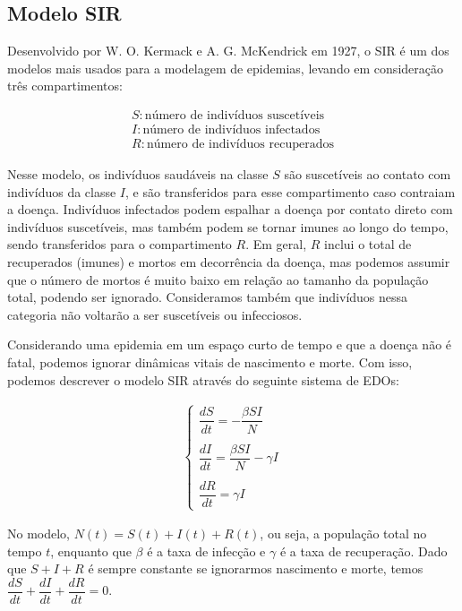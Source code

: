 \documentclass[12pt]{article}
\begin{document}
\subsection{Modelo SIR}

Desenvolvido por W. O. Kermack e A. G. McKendrick em 1927, o SIR é um dos modelos mais usados para a modelagem de epidemias, levando em consideração três compartimentos:

\begin{gather*}
    S: \text{número de indivíduos suscetíveis} \\
    I: \text{número de indivíduos infectados} \\
    R: \text{número de indivíduos recuperados}
\end{gather*}

Nesse modelo, os indivíduos saudáveis na classe $S$ são suscetíveis ao contato com indivíduos da classe $I$, e são transferidos para esse compartimento caso contraiam a doença. Indivíduos infectados podem espalhar a doença por contato direto com indivíduos suscetíveis, mas também podem se tornar imunes ao longo do tempo, sendo transferidos para o compartimento $R$. Em geral, $R$ inclui o total de recuperados (imunes) e mortos em decorrência da doença, mas podemos assumir que o número de mortos é muito baixo em relação ao tamanho da população total, podendo ser ignorado. Consideramos também que indivíduos nessa categoria não voltarão a ser suscetíveis ou infecciosos.   

Considerando uma epidemia em um espaço curto de tempo e que a doença não é fatal, podemos ignorar dinâmicas vitais de nascimento e morte. Com isso, podemos descrever o modelo SIR através do seguinte sistema de EDOs:

\begin{gather*}
\begin{cases}
\dfrac{dS}{dt} = -\dfrac{\beta SI}{N} \\
\\
\dfrac{dI}{dt} = \dfrac{\beta SI}{N} - \gamma I \\
\\
\dfrac{dR}{dt} = \gamma I
\end{cases}
\end{gather*}

No modelo, $N(t) = S(t)+I(t)+R(t)$, ou seja, a população total no tempo $t$, enquanto que $\beta$ é a taxa de infecção e $\gamma$ é a taxa de recuperação. Dado que $S+I+R$ é sempre constante se ignorarmos nascimento e morte, temos $\dfrac{dS}{dt}+\dfrac{dI}{dt}+\dfrac{dR}{dt} = 0$. 
\end{document}
